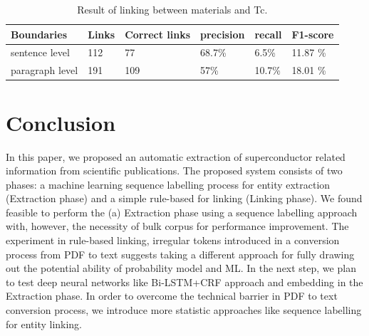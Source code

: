 \documentclass{article}[a4]
\begin{document}
\begin{table}[h!]
    \centering
    \caption{Result of linking between materials and Tc.}   
    \begin{tabular}{ | m{7em} | m{4em}| m{4em}| m{4em}| m{4em} | m{4em} | } 
    \hline
        Boundaries & Links & Correct links & precision & recall & F1-score \\
    \hline
            sentence level  & 112 & 77 & 68.7\% & 6.5\% & 11.87 \% \\
    \hline
            paragraph level & 191 & 109 & 57\% & 10.7\% & 18.01 \% \\
    \hline
    \end{tabular}
    \label{table:result-linking}
\end{table}


\section{Conclusion}
\label{sec:conclusion}
In this paper, we proposed an automatic extraction of superconductor related information from scientific publications. The proposed system consists of two phases: a machine learning sequence labelling process for entity extraction (Extraction phase) and a simple rule-based for linking (Linking phase). 
We found feasible to perform the (a) Extraction phase using a sequence labelling approach with, however, the necessity of bulk corpus for performance improvement. The experiment in rule-based linking, irregular tokens introduced in a conversion process from PDF to text suggests taking a different approach for fully drawing out the potential ability of probability model and ML.
In the next step, we plan to test deep neural networks like Bi-LSTM+CRF approach and embedding in the Extraction phase. In order to overcome the technical barrier in PDF to text conversion process, we introduce more statistic approaches like sequence labelling for entity linking.

\pagebreak



\end{document}
